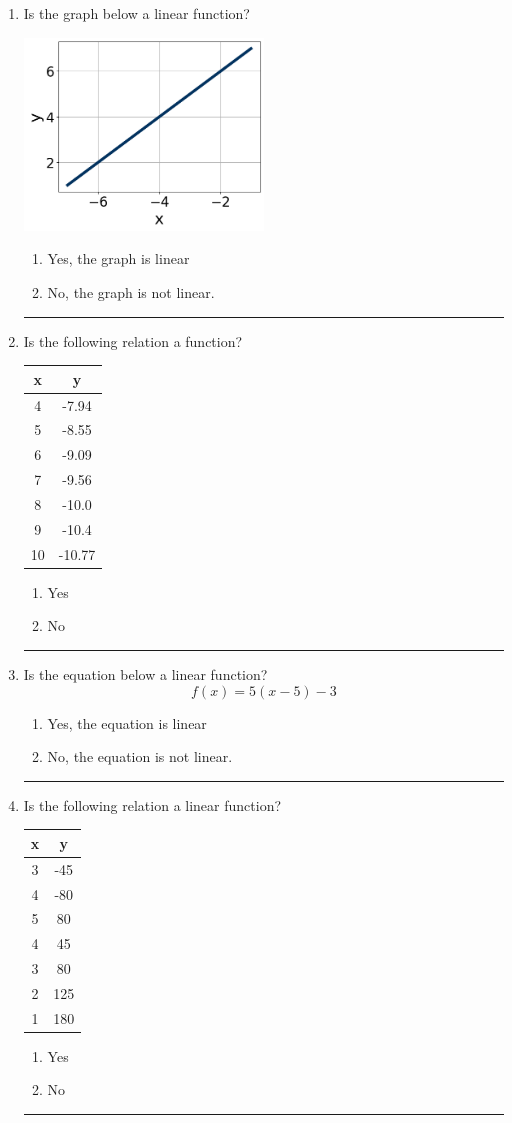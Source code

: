 \documentclass[14pt]{extbook}
\newcommand{\litem}[1]{\item#1\hspace*{-1cm}\rule{\textwidth}{0.4pt}}
\begin{document}
\begin{enumerate}
\litem{
Is the graph below a linear function?
\begin{center}
    \includegraphics[width=0.5\textwidth]{../Figures/MA_8_F_1_2_graphV.png}
\end{center}
\begin{enumerate}[label=\Alph*.]
\item Yes, the graph is linear
\item No, the graph is not linear.

\end{enumerate} }
\litem{
Is the following relation a function?

\begin{tabular}{c|c}
x &y\tabularnewline \hline
4 &-7.94\tabularnewline \hline
5 &-8.55\tabularnewline \hline
6 &-9.09\tabularnewline \hline
7 &-9.56\tabularnewline \hline
8 &-10.0\tabularnewline \hline
9 &-10.4\tabularnewline \hline
10 &-10.77\end{tabular}\begin{enumerate}[label=\Alph*.]
\item Yes
\item No

\end{enumerate} }
\litem{
Is the equation below a linear function?\[ f(x) = 5(x -5)-3 \]\begin{enumerate}[label=\Alph*.]
\item Yes, the equation is linear
\item No, the equation is not linear.

\end{enumerate} }
\litem{
Is the following relation a linear function?

\begin{tabular}{c|c}
x &y\tabularnewline \hline
3 &-45\tabularnewline \hline
4 &-80\tabularnewline \hline
5 &80\tabularnewline \hline
4 &45\tabularnewline \hline
3 &80\tabularnewline \hline
2 &125\tabularnewline \hline
1 &180\end{tabular}\begin{enumerate}[label=\Alph*.]
\item Yes
\item No

\end{enumerate} }
\end{enumerate}
\end{document}
